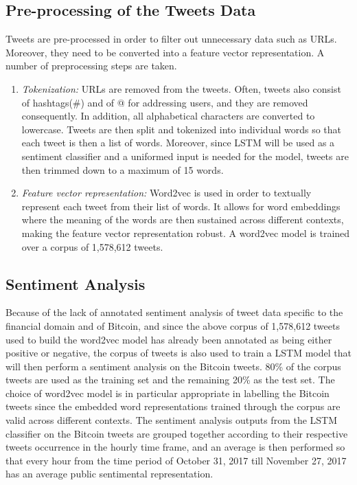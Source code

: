 \documentclass[conference]{IEEEtran}
\begin{document}
\subsection{Pre-processing of the Tweets Data}
\par Tweets are pre-processed in order to filter out unnecessary data such as URLs. Moreover, they need to be converted into a feature vector representation. A number of preprocessing steps are taken.
\begin{enumerate}
\item \textit{Tokenization:} URLs are removed from the tweets. Often, tweets also consist of hashtags(\#) and of @ for addressing users, and they are removed consequently. In addition, all alphabetical characters are converted to lowercase. Tweets are then split and tokenized into individual words so that each tweet is then a list of words. Moreover, since LSTM will be used as a sentiment classifier and a uniformed input is needed for the model, tweets are then trimmed down to a maximum of 15 words.

\item \textit{Feature vector representation:} Word2vec is used in order to textually represent each tweet from their list of words. It allows for word embeddings where the meaning of the words are then sustained across different contexts, making the feature vector representation robust. A word2vec model is trained over a corpus of 1,578,612 tweets.
\end{enumerate}

\subsection{Sentiment Analysis}
\par Because of the lack of annotated sentiment analysis of tweet data specific to the financial domain and of Bitcoin, and since the above corpus of 1,578,612 tweets used to build the word2vec model has already been annotated as being either positive or negative, the corpus of tweets is also used to train a LSTM model that will then perform a sentiment analysis on the Bitcoin tweets. 80\% of the corpus tweets are used as the training set and the remaining 20\% as the test set. The choice of word2vec model is in particular appropriate in labelling the Bitcoin tweets since the embedded word representations trained through the corpus are valid across different contexts. The sentiment analysis outputs from the LSTM classifier on the Bitcoin tweets are grouped together according to their respective tweets occurrence in the hourly time frame, and an average is then performed so that every hour from the time period of October 31, 2017 till November 27, 2017 has an average public sentimental representation.  
\end{document}
